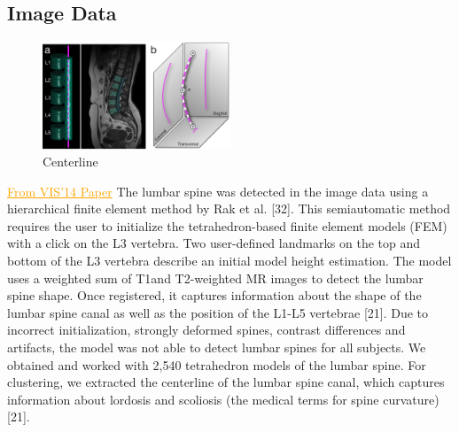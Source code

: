 \documentclass[a4paper,twoside]{style/article}
\newcommand{\com}[1]{\textcolor{orange}{\uline{#1}}}
\begin{document}
\subsection{Image Data}
\begin{figure}[!h]
  \centering
  \includegraphics[width=0.5\textwidth]{figures/centerline}
  \caption{Centerline}
  \label{fig:centerline}
\end{figure}
\com{From VIS'14 Paper}
The lumbar spine was detected in the image data using a hierarchical finite element method by Rak et al. [32]. This semiautomatic method requires the user to initialize the tetrahedron-based finite element models (FEM) with a click on the L3 vertebra. Two user-defined landmarks on the top and bottom of the L3 vertebra describe an initial model height estimation. The model uses a weighted sum of T1and T2-weighted MR images to detect the lumbar spine shape. Once registered, it captures information about the shape of the lumbar spine canal as well as the position of the L1-L5 vertebrae [21]. Due to incorrect initialization, strongly deformed spines, contrast differences and artifacts, the model was not able to detect lumbar spines for all subjects. We obtained and worked with 2,540 tetrahedron models of the lumbar spine. For clustering, we extracted the centerline of the lumbar spine canal, which captures information about lordosis and scoliosis (the medical terms for spine curvature) [21].
\end{document}
